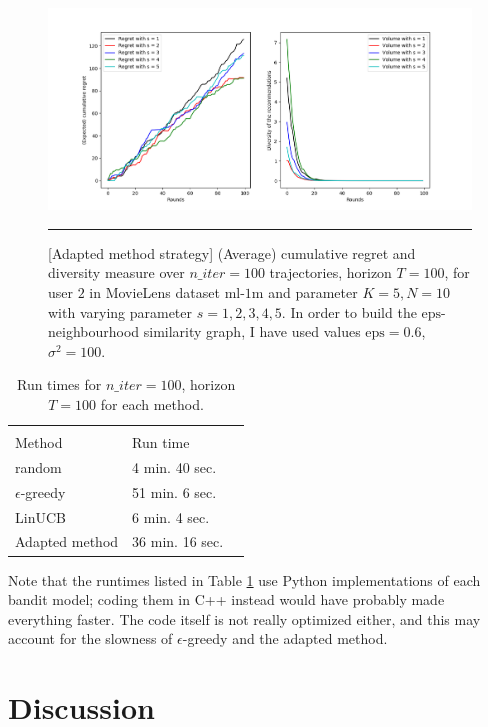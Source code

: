 \documentclass{article}
\begin{document}
\begin{figure}[H]
  \centering
  \rule[-.5cm]{0cm}{4cm}
  \includegraphics[scale=0.5]{../Results/lagree.png}
  \rule[-.5cm]{4cm}{0cm}
  \caption{[Adapted method strategy] (Average) cumulative regret and diversity measure over $n\_iter=100$ trajectories, horizon $T=100$, for user $2$ in MovieLens dataset $\text{ml-1m}$ and parameter $K=5, N=10$ with varying parameter $s=1, 2, 3, 4, 5$. In order to build the $\text{eps}$-neighbourhood similarity graph, I have used values $\text{eps}=0.6$, $\sigma^{2}=100$.}
\end{figure}

\begin{table}[H]
  \caption{Run times for $n\_iter=100$, horizon $T=100$ for each method.}
  \label{runtimes}
  \centering
  \begin{tabular}{lll}
    \multicolumn{2}{c}{}                   \\
    \cmidrule(r){1-2}
    Method     & Run time    \\
    \midrule
    random & 4 min. 40 sec.  \\
    $\epsilon$-greedy & 51 min. 6 sec.  \\
    LinUCB     & 6 min. 4 sec. \\
    Adapted method     & 36 min. 16 sec.       \\
    \bottomrule
  \end{tabular}
\end{table}

Note that the runtimes listed in Table \ref{runtimes} use Python implementations of each bandit model; coding them in C++ instead would have probably made everything faster. The code itself is not really optimized either, and this may account for the slowness of $\epsilon$-greedy and the adapted method.

\section{Discussion}




\end{document}
